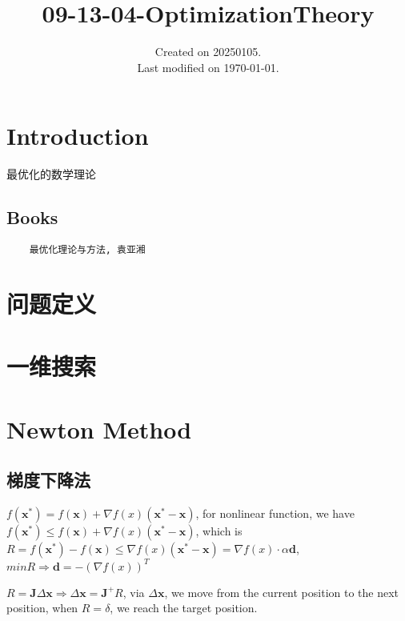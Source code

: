 \documentclass[UTF8]{../../09-Mathematics}
\begin{document}
\title{09-13-04-OptimizationTheory}
\date{Created on 20250105.\\   Last modified on \today.}
\maketitle
\tableofcontents






\chapter{Introduction}

最优化的数学理论


\section{Books}

\begin{lstlisting}
    最优化理论与方法, 袁亚湘
\end{lstlisting}





\chapter{问题定义}
\chapter{一维搜索}
\chapter{Newton Method}

\section{梯度下降法}

$f(\boldsymbol x^*)=f(\boldsymbol x)+\nabla f(x)(\boldsymbol x^*-\boldsymbol x)$,
for nonlinear function, we have $f(\boldsymbol x^*) \leqslant f(\boldsymbol x)+\nabla f(x)(\boldsymbol x^*-\boldsymbol x)$, which is $R=f(\boldsymbol x^*) - f(\boldsymbol x)  \leqslant \nabla f(x)(\boldsymbol x^*-\boldsymbol x)=\nabla f(x) \cdot \alpha \boldsymbol d $, $min R \Rightarrow \boldsymbol d = -(\nabla f(x))^T$

$R=\boldsymbol J \Delta \boldsymbol x \Rightarrow  \Delta \boldsymbol x = \boldsymbol J^+ R$, via $ \Delta \boldsymbol x$, we move from the current position to the next position, when $R=\delta$, we reach the target position.
\end{document}
